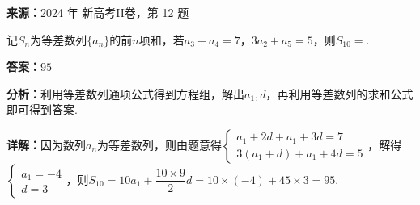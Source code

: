 \begin{question}[points=5]
\textbf{来源：}2024 年 新高考II卷，第 12 题\par
记$S_n$为等差数列$\{a_n\}$的前$n$项和，若$a_3+a_4=7$，$3a_2+a_5=5$，则$S_{10}=$.
\fillin[{$95$}]
\begin{solution}
\textbf{答案：}$95$

\textbf{分析：}利用等差数列通项公式得到方程组，解出$a_1,d$，再利用等差数列的求和公式即可得到答案.

\textbf{详解：}因为数列$a_n$为等差数列，则由题意得$\begin{cases}a_1+2d+a_1+3d=7\\3(a_1+d)+a_1+4d=5\end{cases}$，解得$\begin{cases}a_1=-4\\d=3\end{cases}$，则$S_{10}=10a_1+\dfrac{10\times9}{2}d=10\times(-4)+45\times3=95$.
\end{solution}
\end{question}

